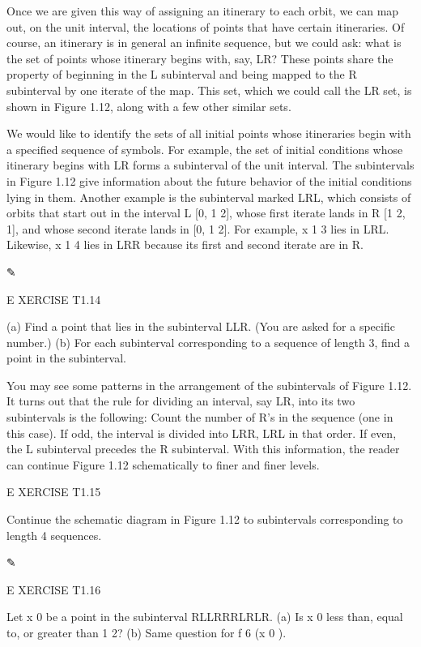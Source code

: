 \documentclass[12pt]{article}
\begin{document}
Once we are given this way of assigning an itinerary to each orbit, we can map out, on the unit interval, 
the locations of points that have certain itineraries. Of course, an itinerary is in general an inﬁnite 
sequence, but we could ask: what is the set of points whose itinerary begins with, say, LR? These points 
share the property of beginning in the L subinterval and being mapped to the R subinterval by one iterate 
of the map. This set, which we could call the LR set, is shown in Figure 1.12, along with a few other 
similar sets.

We would like to identify the sets of all initial points whose itineraries begin with a speciﬁed sequence 
of symbols. For example, the set of initial conditions whose itinerary begins with LR forms a subinterval 
of the unit interval. The subintervals in Figure 1.12 give information about the future behavior of the 
initial conditions lying in them. Another example is the subinterval marked LRL, which consists of orbits 
that start out in the interval L  [0, 1  2], whose ﬁrst iterate lands in R  [1  2, 1], and whose second 
iterate lands in [0, 1  2]. For example, x  1  3 lies in LRL. Likewise, x  1  4 lies in LRR because its 
ﬁrst and second iterate are in R.

✎

E XERCISE T1.14

(a) Find a point that lies in the subinterval LLR. (You are asked for a speciﬁc number.) (b) For each 
subinterval corresponding to a sequence of length 3, ﬁnd a point in the subinterval.

You may see some patterns in the arrangement of the subintervals of Figure 1.12. It turns out that the rule 
for dividing an interval, say LR, into its two subintervals is the following: Count the number of R’s in 
the sequence (one in this case). If odd, the interval is divided into LRR, LRL in that order. If even, the 
L subinterval precedes the R subinterval. With this information, the reader can continue Figure 1.12 
schematically to ﬁner and ﬁner levels.

E XERCISE T1.15

Continue the schematic diagram in Figure 1.12 to subintervals corresponding to length 4 sequences.

✎

E XERCISE T1.16

Let x 0 be a point in the subinterval RLLRRRLRLR. (a) Is x 0 less than, equal to, or greater than 1  2? (b) 
Same question for f 6 (x 0 ).
\end{document}
